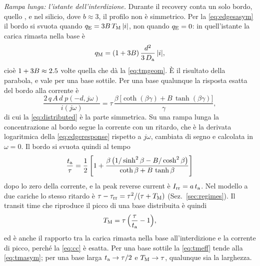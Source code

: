 \documentclass[10pt,a4paper]{scrartcl}
\let\newcommand\pdvaluedefine
\newcommand{\Irr}{I_\mathrm{rr}}
\newcommand{\ta}{t_\mathrm{a}}
\newcommand{\taurr}{\tau_\mathrm{rr}}
\newcommand{\TM}{T_\mathrm{M}}
\newcommand{\qE}{q_\mathrm{E}}
\newcommand{\qM}{q_\mathrm{M}}
\newcommand{\Da}{D_\mathrm{a}}
\newcommand{\Pp}{p\textsuperscript{+}}
\begin{document}
\emph{Rampa lunga: l'istante dell'interdizione.} Durante il recovery conta un solo bordo, quello \Pp, e nel silicio, dove $b \approx 3$, il profilo non è simmetrico. Per la \eqref{eq:edgesasym} il bordo \Pp{} si svuota quando $\qE = 3B\,\TM\,|i|$, non quando $\qE = 0$: in quell'istante la carica rimasta nella base è
\begin{equation}
\qM = (1 + 3B)\,\frac{d^2}{3\,\Da}\,|i| ,
\label{eq:tmasym}
\end{equation}
cioè $1 + 3B \approx \num{2.5}$ volte quella che dà la \eqref{eq:tmgeom}. È il risultato della parabola, e vale per una base sottile. Per una base qualunque la risposta esatta del bordo \Pp{} alla corrente è
\begin{equation}
\frac{2\,q\,A\,d\;p(-d,j\omega)}{i(j\omega)} = \tau\,\frac{\beta\,\bigl[\coth(\beta\gamma) + B\,\tanh(\beta\gamma)\bigr]}{\gamma} ,
\label{eq:edgeresponse}
\end{equation}
di cui la \eqref{eq:distributed} è la parte simmetrica. Su una rampa lunga la concentrazione al bordo segue la corrente con un ritardo, che è la derivata logaritmica della \eqref{eq:edgeresponse} rispetto a $j\omega$, cambiata di segno e calcolata in $\omega = 0$. Il bordo si svuota quindi al tempo
\begin{equation}
\frac{\ta}{\tau} = \frac12\left[1 + \frac{\beta\,\bigl(1/\sinh^2\beta - B/\cosh^2\beta\bigr)}{\coth\beta + B\,\tanh\beta}\right]
\label{eq:tadist}
\end{equation}
dopo lo zero della corrente, e la peak reverse current è $\Irr = a\,\ta$. Nel modello a due cariche lo stesso ritardo è $\tau - \taurr = \tau^2/(\tau+\TM)$ (Sez.~\ref{sec:regimes}). Il transit time che riproduce il picco di una base distribuita è quindi
\begin{equation}
\TM = \tau\,\Bigl(\frac{\tau}{\ta} - 1\Bigr) ,
\label{eq:tmeff}
\end{equation}
ed è anche il rapporto tra la carica rimasta nella base all'interdizione e la corrente di picco, perché la \eqref{eq:cc} è esatta. Per una base sottile la \eqref{eq:tmeff} tende alla \eqref{eq:tmasym}; per una base larga $\ta \to \tau/2$ e $\TM \to \tau$, qualunque sia la larghezza.
\end{document}

